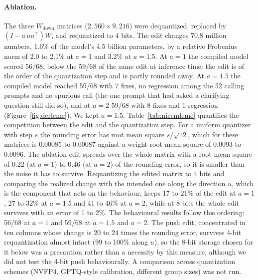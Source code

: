 \documentclass[11pt]{article}
\begin{document}
\paragraph{Ablation.} The three $W_{\text{down}}$ matrices ($2{,}560 \times 9{,}216$) were dequantized, replaced by $(I - a\,u u^{\top})W$, and requantized to 4 bits. The edit changes 70.8 million numbers, 1.6\% of the model's 4.5 billion parameters, by a relative Frobenius norm of 2.0 to 2.1\% at $a=1$ and 3.2\% at $a=1.5$. At $a=1$ the compiled model scored 56/68, below the 59/68 of the same edit at inference time: the edit is of the order of the quantization step and is partly rounded away. At $a=1.5$ the compiled model reached 59/68 with 7 fixes, no regression among the 52 calling prompts and no spurious call (the one prompt that had asked a clarifying question still did so), and at $a=2$ 59/68 with 8 fixes and 1 regression (Figure~\ref{fig:derleme}). We kept $a=1.5$. Table~\ref{tab:nicemleme} quantifies the competition between the edit and the quantization step. For a uniform quantizer with step $s$ the rounding error has root mean square $s/\sqrt{12}$, which for these matrices is 0.00085 to 0.00087 against a weight root mean square of 0.0093 to 0.0096. The ablation edit spreads over the whole matrix with a root mean square of 0.22 (at $a=1$) to 0.46 (at $a=2$) of the rounding error, so it is smaller than the noise it has to survive. Requantizing the edited matrix to 4 bits and comparing the realized change with the intended one along the direction $u$, which is the component that acts on the behaviour, keeps 17 to 21\% of the edit at $a=1$, 27 to 32\% at $a=1.5$ and 41 to 46\% at $a=2$, while at 8 bits the whole edit survives with an error of 1 to 2\%. The behavioural results follow this ordering: 56/68 at $a=1$ and 59/68 at $a=1.5$ and $a=2$. The push edit, concentrated in ten columns whose change is 20 to 24 times the rounding error, survives 4-bit requantization almost intact (99 to 100\% along $u$), so the 8-bit storage chosen for it below was a precaution rather than a necessity by this measure, although we did not test the 4-bit push behaviourally. A comparison across quantization schemes (NVFP4, GPTQ-style calibration, different group sizes) was not run.
\end{document}
